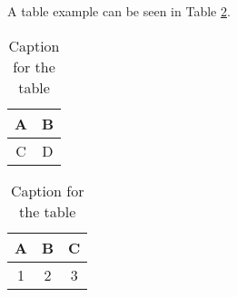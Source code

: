 \documentclass[
   article,       %
   12pt,          %
   oneside,       %
   a4paper,       %
   english,       %
   brazil,           %
   sumario=tradicional
   ]{abntex2}
\begin{document}
A table example can be seen in Table \ref{table-example}.
\begin{table}[ht]
\centering
\begin{tabular}{|c|c|}
    \hline
    A & B\\
    \hline
    C & D\\
    \hline
\end{tabular}
\caption{Caption for the table}
\label{table-example}
\end{table}



\begin{table}[h]
\caption{Caption for the table}
\label{table-example}
\end{table}


\begin{table}[h]
\centering
{}
\caption{Caption for the table}
\label{table-example}
\end{table}


\begin{table}[h]
\centering
\footnotesize{\begin{tabular}{|c|c|c|}
    \hline
    A & B & C\\
    \hline
    1 & 2 & 3\\
    \hline
\end{tabular}}
\caption{Caption for the table}
\label{table-example}
\end{table}
\end{document}
